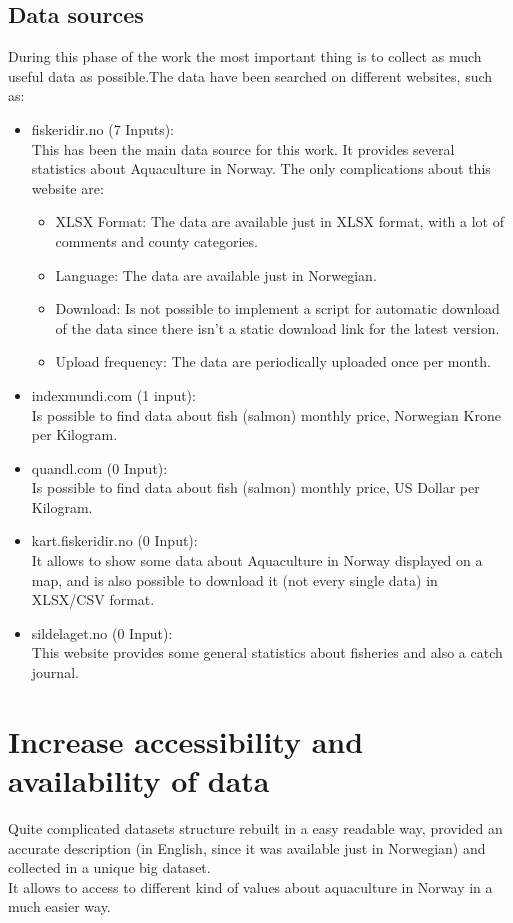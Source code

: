 \subsection{Data sources}
During this phase of the work the most important thing is to collect as much useful data as possible.The data have been searched on different websites, such as:
\begin{itemize}
\item fiskeridir.no (7 Inputs): \\ This has been the main data source for this work. It provides several statistics about Aquaculture in Norway. The only complications about this website are:
\begin{itemize}
\item XLSX Format: The data are available just in XLSX format, with a lot of comments and county categories.
\item Language: The data are available just in Norwegian.
\item Download: Is not possible to implement a script for automatic download of the data since there isn't a static download link for the latest version.
\item Upload frequency: The data are periodically uploaded once per month.
\end{itemize}

\item indexmundi.com (1 input):\\ Is possible to find data about fish (salmon) monthly price, Norwegian Krone per Kilogram.

\item quandl.com (0 Input):\\ Is possible to find data about fish (salmon) monthly price, US Dollar per Kilogram.

\item kart.fiskeridir.no (0 Input):\\ It allows to show some data about Aquaculture in Norway displayed on a map, and is also possible to download it (not every single data) in XLSX/CSV format. 

\item sildelaget.no (0 Input):\\ This website provides some general statistics about fisheries and also a catch journal.

\end{itemize}


\section{Increase accessibility and availability of data}
Quite complicated datasets structure rebuilt in a easy readable way, provided an accurate description (in English, since it was available just in Norwegian) and collected in a unique big dataset. \\
It allows to access to different kind of values about aquaculture in Norway in a much easier way.

